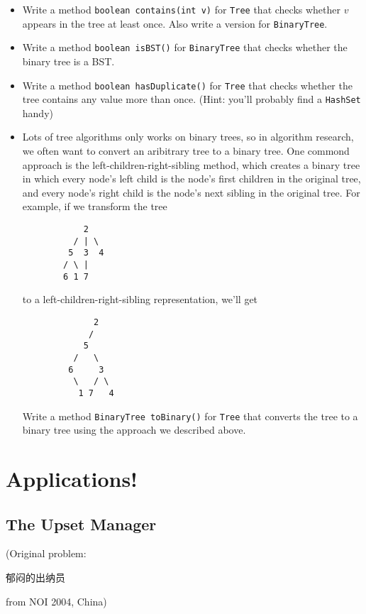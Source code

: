 \documentclass{article}
\begin{document}
\begin{itemize}
    \item Write a method \verb|boolean contains(int v)| for \verb|Tree| that checks whether $v$ appears in the tree at least once.  Also write a version for \verb|BinaryTree|.
    \item Write a method \verb|boolean isBST()| for \verb|BinaryTree| that checks whether the binary tree is a BST.
    \item Write a method \verb|boolean hasDuplicate()| for \verb|Tree| that checks whether the tree contains any value more than once.  {\tiny (Hint: you'll probably find a \verb|HashSet| handy)}
    \item Lots of tree algorithms only works on binary trees, so in algorithm research, we often want to convert an aribitrary tree to a binary tree.  One commond approach is the left-children-right-sibling method, which creates a binary tree in which every node's left child is the node's first children in the original tree, and every node's right child is the node's next sibling in the original tree.  For example, if we transform the tree
        \begin{verbatim}
            2
          / | \
         5  3  4
        / \ |
        6 1 7
        \end{verbatim}
        to a left-children-right-sibling representation, we'll get
        \begin{verbatim}
              2
             /
            5
          /   \
         6     3
          \   / \
           1 7   4
        \end{verbatim} %
        Write a method \verb|BinaryTree toBinary()| for \verb|Tree| that converts the tree to a binary tree using the approach we described above.
\end{itemize}

\section{Applications!}
\subsection{The Upset Manager}
(Original problem: \begin{CJK*}{UTF8}{gbsn}郁闷的出纳员\end{CJK*} from NOI 2004, China)
\end{document}
